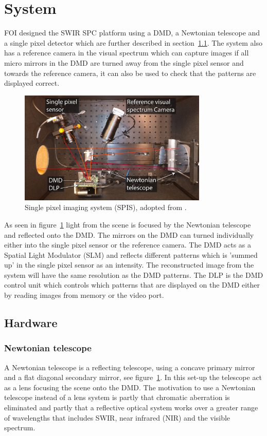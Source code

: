 \section{System}
\label{sec:system}
FOI designed the SWIR SPC platform using a DMD, a Newtonian telescope and a single pixel detector which are further described in section~\ref{sec:hardware}. The system also has a reference camera in the visual spectrum  which can capture images if all micro mirrors in the DMD are turned away from the single pixel sensor and towards the reference camera, it can also be used to check that the patterns are displayed correct.  

\begin{figure}[H]
    \centering
    \includegraphics[width = 0.8\textwidth]{gfx/SPC.png}
    \caption{Single pixel imaging system (SPIS), adopted from \cite{article:foiSPIS}.}
    \label{fig:system1}
\end{figure}



As seen in figure~\ref{fig:system1} light from the scene is focused by the Newtonian telescope and reflected onto the DMD. The mirrors on the DMD can turned individually either into the single pixel sensor or the reference camera. The DMD acts as a Spatial Light Modulator (SLM) and reflects different patterns which is 'summed up' in the single pixel sensor as an intensity. The reconstructed image from the system will have the same resolution as the DMD patterns. The DLP is the DMD control unit which controls which patterns that are displayed on the DMD either by reading images from memory or the video port.   

\subsection{Hardware}
\label{sec:hardware}
\subsubsection{Newtonian telescope}
A Newtonian telescope is a reflecting telescope, using a concave primary mirror and a flat diagonal secondary mirror, see figure~\ref{fig:system1}. In this set-up the telescope act as a lens focusing the scene onto the DMD. The motivation to use a Newtonian telescope instead of a lens system is partly that chromatic aberration is eliminated and partly that a reflective optical system works over a greater range of wavelengths that includes SWIR, near infrared (NIR) and the visible spectrum.


